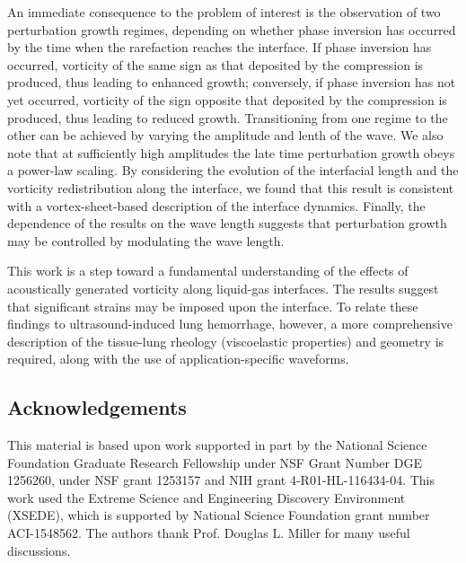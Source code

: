 An immediate consequence to the problem of interest is the observation
of two perturbation growth regimes, depending on whether phase
inversion has occurred by the time when the rarefaction reaches the
interface. If phase inversion has occurred, vorticity of the same sign
as that deposited by the compression is produced, thus leading to
enhanced growth; conversely, if phase inversion has not yet occurred,
vorticity of the sign opposite that deposited by the compression is
produced, thus leading to reduced growth. Transitioning from one
regime to the other can be achieved by varying the amplitude and lenth
of the wave.  We also note that at sufficiently high amplitudes the
late time perturbation growth obeys a power-law scaling. By
considering the evolution of the interfacial length and the vorticity
redistribution along the interface, we found that this result is
consistent with a vortex-sheet-based description of the interface
dynamics. Finally, the dependence of the results on the wave length
suggests that perturbation growth may be controlled by modulating the
wave length.

This work is a step toward a fundamental understanding of the effects
of acoustically generated vorticity along liquid-gas interfaces. The
results suggest that significant strains may be imposed upon the
interface.  To relate these findings to ultrasound-induced lung
hemorrhage, however, a more comprehensive description of the
tissue-lung rheology (viscoelastic properties) and geometry is
required, along with the use of application-specific waveforms.




\subsection*{Acknowledgements}

This material is based upon work supported in part by the National
Science Foundation Graduate Research Fellowship under NSF Grant Number
DGE 1256260, under NSF grant 1253157 and NIH grant
4-R01-HL-116434-04. This work used the Extreme Science and Engineering
Discovery Environment (XSEDE), which is supported by National Science
Foundation grant number ACI-1548562. The authors thank Prof. Douglas
L. Miller for many useful discussions.


\appendix
